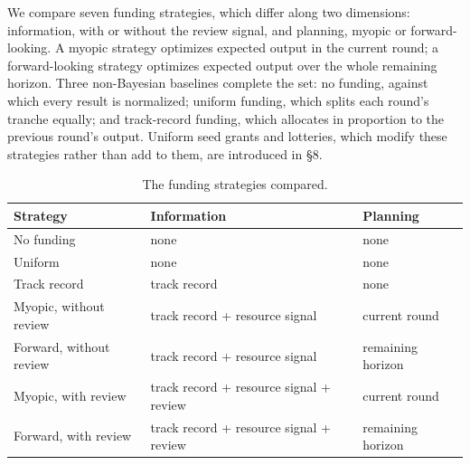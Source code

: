 \documentclass[article, 11pt, reqno]{amsart}
\theoremstyle{named}
\begin{document}
We compare seven funding strategies, which differ along two dimensions: information, with
or without the review signal, and planning, myopic or forward-looking. A myopic strategy
optimizes expected output in the current round; a forward-looking strategy optimizes
expected output over the whole remaining horizon. Three non-Bayesian baselines complete
the set: no funding, against which every result is normalized; uniform funding, which
splits each round's tranche equally; and track-record funding, which allocates in
proportion to the previous round's output. Uniform seed grants and lotteries, which modify
these strategies rather than add to them, are introduced in \S8.

\begin{table}[t]
\centering
\footnotesize
\setlength{\tabcolsep}{4pt}
\begin{tabular*}{\textwidth}{@{\extracolsep{\fill}}lll@{}}
\toprule
Strategy & Information & Planning \\
\midrule
No funding & none & none \\
Uniform & none & none \\
Track record & track record & none \\
Myopic, without review & track record + resource signal & current round \\
Forward, without review & track record + resource signal & remaining horizon \\
Myopic, with review & track record + resource signal + review & current round \\
Forward, with review & track record + resource signal + review & remaining horizon \\
\bottomrule
\end{tabular*}
\caption{The funding strategies compared.}
\label{tab:strategies}
\end{table}
\end{document}
